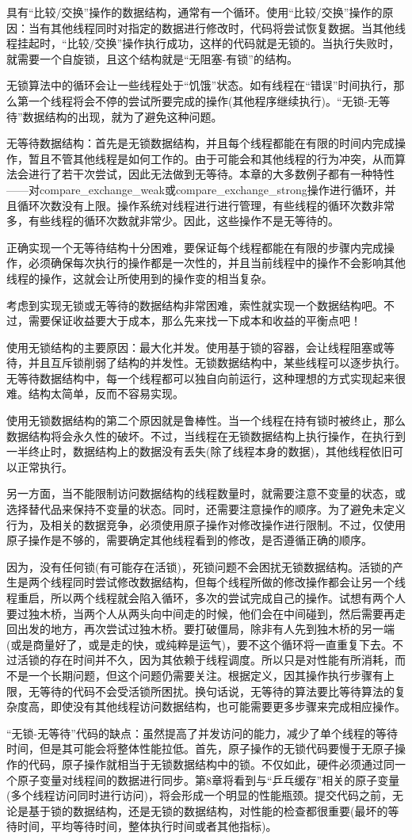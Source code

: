 具有“比较/交换”操作的数据结构，通常有一个循环。使用“比较/交换”操作的原因：当有其他线程同时对指定的数据进行修改时，代码将尝试恢复数据。当其他线程挂起时，“比较/交换”操作执行成功，这样的代码就是无锁的。当执行失败时，就需要一个自旋锁，且这个结构就是“无阻塞-有锁”的结构。

无锁算法中的循环会让一些线程处于“饥饿”状态。如有线程在“错误”时间执行，那么第一个线程将会不停的尝试所要完成的操作(其他程序继续执行)。“无锁-无等待”数据结构的出现，就为了避免这种问题。


无等待数据结构：首先是无锁数据结构，并且每个线程都能在有限的时间内完成操作，暂且不管其他线程是如何工作的。由于可能会和其他线程的行为冲突，从而算法会进行了若干次尝试，因此无法做到无等待。本章的大多数例子都有一种特性——对compare\_exchange\_weak或compare\_exchange\_strong操作进行循环，并且循环次数没有上限。操作系统对线程进行进行管理，有些线程的循环次数非常多，有些线程的循环次数就非常少。因此，这些操作不是无等待的。

正确实现一个无等待结构十分困难，要保证每个线程都能在有限的步骤内完成操作，必须确保每次执行的操作都是一次性的，并且当前线程中的操作不会影响其他线程的操作，这就会让所使用到的操作变的相当复杂。

考虑到实现无锁或无等待的数据结构非常困难，索性就实现一个数据结构吧。不过，需要保证收益要大于成本，那么先来找一下成本和收益的平衡点吧！


使用无锁结构的主要原因：最大化并发。使用基于锁的容器，会让线程阻塞或等待，并且互斥锁削弱了结构的并发性。无锁数据结构中，某些线程可以逐步执行。无等待数据结构中，每一个线程都可以独自向前运行，这种理想的方式实现起来很难。结构太简单，反而不容易实现。

使用无锁数据结构的第二个原因就是鲁棒性。当一个线程在持有锁时被终止，那么数据结构将会永久性的破坏。不过，当线程在无锁数据结构上执行操作，在执行到一半终止时，数据结构上的数据没有丢失(除了线程本身的数据)，其他线程依旧可以正常执行。

另一方面，当不能限制访问数据结构的线程数量时，就需要注意不变量的状态，或选择替代品来保持不变量的状态。同时，还需要注意操作的顺序。为了避免未定义行为，及相关的数据竞争，必须使用原子操作对修改操作进行限制。不过，仅使用原子操作是不够的，需要确定其他线程看到的修改，是否遵循正确的顺序。

因为，没有任何锁(有可能存在活锁)，死锁问题不会困扰无锁数据结构。活锁的产生是两个线程同时尝试修改数据结构，但每个线程所做的修改操作都会让另一个线程重启，所以两个线程就会陷入循环，多次的尝试完成自己的操作。试想有两个人要过独木桥，当两个人从两头向中间走的时候，他们会在中间碰到，然后需要再走回出发的地方，再次尝试过独木桥。要打破僵局，除非有人先到独木桥的另一端(或是商量好了，或是走的快，或纯粹是运气)，要不这个循环将一直重复下去。不过活锁的存在时间并不久，因为其依赖于线程调度。所以只是对性能有所消耗，而不是一个长期问题，但这个问题仍需要关注。根据定义，因其操作执行步骤有上限，无等待的代码不会受活锁所困扰。换句话说，无等待的算法要比等待算法的复杂度高，即使没有其他线程访问数据结构，也可能需要更多步骤来完成相应操作。

“无锁-无等待”代码的缺点：虽然提高了并发访问的能力，减少了单个线程的等待时间，但是其可能会将整体性能拉低。首先，原子操作的无锁代码要慢于无原子操作的代码，原子操作就相当于无锁数据结构中的锁。不仅如此，硬件必须通过同一个原子变量对线程间的数据进行同步。第8章将看到与“乒乓缓存”相关的原子变量(多个线程访问同时进行访问)，将会形成一个明显的性能瓶颈。提交代码之前，无论是基于锁的数据结构，还是无锁的数据结构，对性能的检查都很重要(最坏的等待时间，平均等待时间，整体执行时间或者其他指标)。
